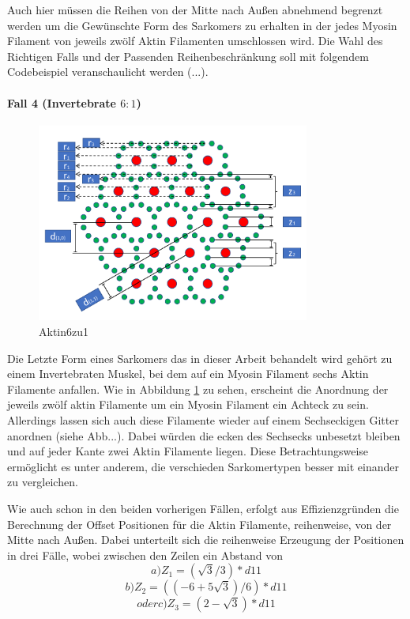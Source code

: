 \documentclass[a4paper,m]{cgBA}
\begin{document}
Auch hier müssen die Reihen von der Mitte nach Außen abnehmend begrenzt werden um die Gewünschte Form des Sarkomers zu erhalten in der jedes Myosin Filament von jeweils zwölf Aktin Filamenten umschlossen wird.
Die Wahl des Richtigen Falls und der Passenden Reihenbeschränkung soll mit folgendem Codebeispiel veranschaulicht werden (...).

\paragraph{Fall 4 (Invertebrate \(6:1\))}

\begin{figure}[h]
\center
\includegraphics[width=0.8\textwidth]{Graphics/Actin6zu1Abstaende.pdf}
\caption{Aktin6zu1}
\label{fig:Aktin6zu1}
\end{figure}

Die Letzte Form eines Sarkomers das in dieser Arbeit behandelt wird gehört zu einem Invertebraten Muskel, bei dem auf ein Myosin Filament sechs Aktin Filamente anfallen. Wie in Abbildung \ref{fig:Aktin6zu1} zu sehen, erscheint die Anordnung der jeweils zwölf aktin Filamente um ein Myosin Filament ein Achteck zu sein. Allerdings lassen sich auch diese Filamente wieder auf einem Sechseckigen Gitter anordnen (siehe Abb...). Dabei würden die ecken des Sechsecks unbesetzt bleiben und auf jeder Kante zwei Aktin Filamente liegen. Diese Betrachtungsweise ermöglicht es unter anderem, die verschieden Sarkomertypen besser mit einander zu vergleichen.

Wie auch schon in den beiden vorherigen Fällen, erfolgt aus Effizienzgründen die Berechnung der Offset Positionen für die Aktin Filamente, reihenweise, von der Mitte nach Außen. Dabei unterteilt sich die reihenweise Erzeugung der Positionen in drei Fälle, wobei zwischen den Zeilen ein Abstand von 
\begin{equation}
a) Z_1 = (\sqrt{3} / 3) * d11
\end{equation}
\begin{equation}
b) Z_2 =((-6 + 5\sqrt{3}) / 6) * d11
\end{equation}
\begin{equation}
 oder c) Z_3 =(2 - \sqrt{3}) * d11
\end{equation}
\end{document}
